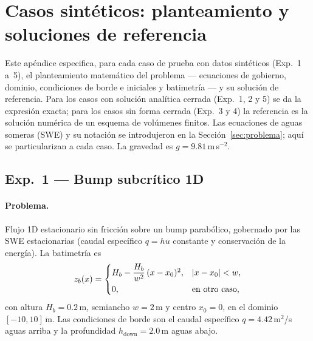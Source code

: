 \section{Casos sintéticos: planteamiento y soluciones de referencia}
\label{app:casos-sinteticos}

Este apéndice especifica, para cada caso de prueba con datos sintéticos
(Exp.~1 a~5), el planteamiento matemático del problema --- ecuaciones de
gobierno, dominio, condiciones de borde e iniciales y batimetría --- y su
solución de referencia. Para los casos con solución analítica cerrada
(Exp.~1, 2 y 5) se da la expresión exacta; para los casos sin forma cerrada
(Exp.~3 y 4) la referencia es la solución numérica de un esquema de volúmenes
finitos. Las ecuaciones de aguas someras (SWE) y su notación se introdujeron
en la Sección~\ref{sec:problema}; aquí se particularizan a cada caso. La
gravedad es $g = 9.81$\,m\,s$^{-2}$.

\subsection{Exp.\ 1 --- Bump subcrítico 1D}
\label{app:exp1}

\paragraph{Problema.}
Flujo 1D estacionario sin fricción sobre un bump parabólico, gobernado por las
SWE estacionarias (caudal específico $q = h u$ constante y conservación de la
energía). La batimetría es
\begin{equation}
  z_b(x) =
  \begin{cases}
    H_b - \dfrac{H_b}{w^2}\,(x - x_0)^2, & |x - x_0| < w,\\[1.2ex]
    0, & \text{en otro caso,}
  \end{cases}
\end{equation}
con altura $H_b = 0.2$\,m, semiancho $w = 2$\,m y centro $x_0 = 0$, en el
dominio $[-10, 10]$\,m. Las condiciones de borde son el caudal específico
$q = 4.42$\,m$^2$/s aguas arriba y la profundidad $h_{\text{down}} = 2.0$\,m
aguas abajo.

